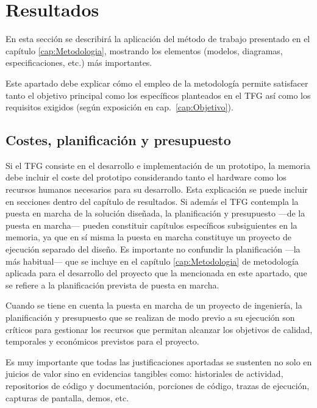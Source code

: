 \chapter{Resultados}
\label{cap:Resultados}

En esta sección se describirá la aplicación del método de trabajo presentado en el capítulo \ref{cap:Metodologia},  mostrando los elementos (modelos, diagramas, especificaciones, etc.) más importantes. 

Este apartado debe explicar cómo el empleo de la metodología permite satisfacer tanto el objetivo principal como los específicos planteados en el TFG así como los requisitos exigidos (según exposición en cap.~\ref{cap:Objetivo}).

\section{Costes, planificación y presupuesto}
Si el TFG consiste en el desarrollo e implementación de un prototipo, la memoria  debe incluir el coste del prototipo considerando tanto el hardware como los recursos humanos necesarios para su desarrollo. Esta explicación se puede incluir en secciones dentro del capítulo de resultados. Si además el TFG contempla la puesta en marcha de la solución diseñada, la planificación y presupuesto ---de la puesta en marcha--- pueden constituir capítulos específicos subsiguientes en la memoria, ya que en sí misma la puesta en marcha constituye un proyecto de ejecución separado del diseño. Es importante no confundir la planificación ---la más habitual--- que se incluye en el capítulo \ref{cap:Metodologia} de metodología aplicada para el desarrollo del proyecto que la mencionada en este apartado, que se refiere a la planificación prevista de puesta en marcha.

Cuando se tiene en cuenta la puesta en marcha de un proyecto de ingeniería, la planificación y presupuesto que se realizan de modo previo a su ejecución son críticos para gestionar los recursos que permitan alcanzar los objetivos de calidad, temporales y económicos previstos para el proyecto. 

Es muy importante que todas las justificaciones aportadas se sustenten no solo en juicios de valor sino en evidencias tangibles como: historiales de actividad, repositorios de código y documentación, porciones de código, trazas de ejecución, capturas de pantalla, demos, etc.
